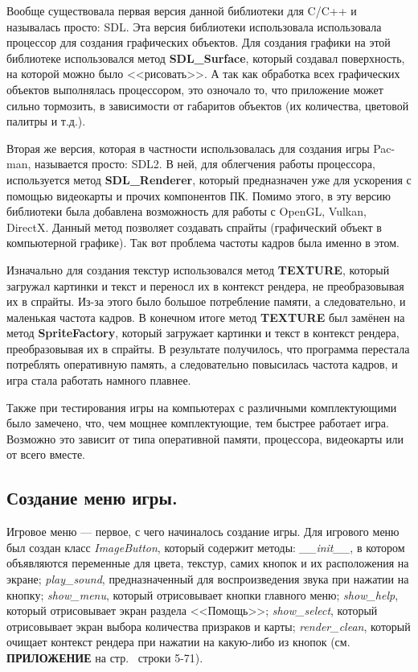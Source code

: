 Вообще существовала первая версия данной библиотеки для C/C++ и называлась просто: SDL. Эта версия библиотеки использовала использовала процессор для создания графических объектов.
Для создания графики на этой библиотеке использовался метод \textbf{SDL\_Surface}, который создавал поверхность, на которой можно было <<рисовать>>. А так как обработка всех графических объектов выполнялась процессором, это озночало то, что приложение может сильно тормозить, в зависимости от габаритов объектов (их количества, цветовой палитры и т.д.).

Вторая же версия, которая в частности использовалась для создания игры Pac-man, называется просто: SDL2. В ней, для облегчения работы процессора, используется метод \textbf{SDL\_Renderer},
который предназначен уже для ускорения с помощью видеокарты и прочих компонентов ПК. Помимо этого, в эту версию библиотеки была добавлена возможность для работы с OpenGL, Vulkan, DirectX.
Данный метод позволяет создавать спрайты (графический объект в компьютерной графике). Так вот проблема частоты кадров была именно в этом.

Изначально для создания текстур использовался метод \textbf{TEXTURE}, который загружал картинки и текст и переносл их в контекст рендера, не преобразовывая их в спрайты. Из-за этого было большое
потребление памяти, а следовательно, и маленькая частота кадров. В конечном итоге метод \textbf{TEXTURE} был замёнен на метод \textbf{SpriteFactory}, который загружает картинки и текст в контекст рендера, преобразовывая их в спрайты. В результате получилось, что программа перестала потреблять оперативную память, а следовательно повысилась частота кадров, и игра стала работать намного плавнее.

Также при тестирования игры на компьютерах с различными комплектующими было замечено, что, чем мощнее комплектующие, тем быстрее работает игра. Возможно это зависит от типа оперативной памяти, процессора, видеокарты или от всего вместе.

\subsection{\label{subsec:ch02/sec01/sub03}Создание меню игры.}
Игровое меню --- первое, с чего начиналось создание игры. Для игрового меню был создан класс \textit{ImageButton}, который содержит методы: \textit{\_\_init\_\_}, в котором объявляются переменные для цвета, текстур, самих кнопок и их расположения на экране; \textit{play\_sound}, предназначенный для воспроизведения звука при нажатии на кнопку; \textit{show\_menu}, который отрисовывает кнопки главного меню; \textit{show\_help}, который отрисовывает экран раздела <<Помощь>>; \textit{show\_select}, который отрисовывает экран выбора количества призраков и карты; \textit{render\_clean}, который очищает контекст рендера при нажатии на какую-либо из кнопок (см. \textbf{\textsc{ПРИЛОЖЕНИЕ}} на стр.~\pageref{code:menu} строки 5-71).

